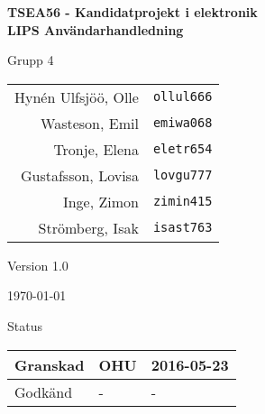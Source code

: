 \documentclass[11pt]{article}
\begin{document}
\begin{titlepage}
\begin{center}

{\Large\bfseries TSEA56 - Kandidatprojekt i elektronik \\ LIPS Användarhandledning}
\begin{figure}[!htbp]
  \begin{center}
\noindent{}
  \end{center}
\end{figure}


  \begin{minipage}{0.5\textwidth}
    \centering
 Grupp 4 \\
\begin{tabular}{rl}
Hynén Ulfsjöö, Olle&\verb+ollul666+
\\
Wasteson, Emil&\verb+emiwa068+
\\
Tronje, Elena&\verb+eletr654+
\\
Gustafsson, Lovisa&\verb+lovgu777+
\\
Inge, Zimon&\verb+zimin415+
\\
Strömberg, Isak&\verb+isast763+
\\
\end{tabular}
\end{minipage}%
\begin{minipage}{0.5\textwidth}
  \centering
Version 1.0

\today
\vspace{2em}

Status
\begin{longtable}{|l|l|l|} \hline

Granskad & OHU & 2016-05-23 \\ \hline
Godkänd & - & - \\ \hline
 
\end{longtable}
\end{minipage}


\end{center}
\end{titlepage}
\end{document}
